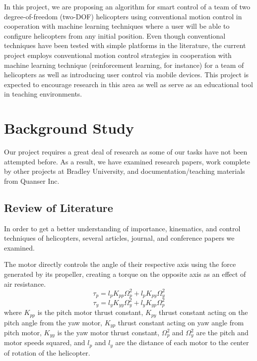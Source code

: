 \documentclass[letterpaper, 10pt, conference]{ieeeconf}
\begin{document}
In this project, we are proposing an algorithm for smart control of a team of two degree-of-freedom (two-DOF) helicopters using conventional motion control in cooperation with machine learning techniques where a user will be able to configure helicopters from any initial position.  Even though conventional techniques have been tested with simple platforms in the literature, the current project employs conventional motion control strategies in cooperation with machine learning technique (reinforcement learning, for instance) for a team of helicopters as well as introducing user control via mobile devices.  This project is expected to encourage research in this area as well as serve as an educational tool in teaching environments.  


\section{Background Study} %
Our project requires a great deal of research as some of our tasks have not been attempted before.  As a result, we have examined research papers, work complete by other projects at Bradley University, and documentation/teaching materials from Quanser Inc.

\subsection{Review of Literature}
In order to get a better understanding of importance, kinematics, and control techniques of helicopters, several articles, journal, and conference papers we examined.



The motor directly controls the angle of their respective axis using the force generated by its propeller, creating a torque on the opposite axis as an effect of air resistance. \cite{Neto}
\begin{equation}
    \tau_p = l_pK_{pp}\Omega^2_p+l_pK_{py}\Omega^2_y
\end{equation}
\begin{equation}
    \tau_y = l_yK_{yy}\Omega^2_y+l_yK_{yp}\Omega^2_p
\end{equation}
where $K_{pp}$ is the pitch motor thrust constant, $K_{py}$ thrust constant acting on the pitch angle from the yaw motor, $K_{yp}$ thrust constant acting on yaw angle from pitch motor, $K_{yy}$ is the yaw motor thrust constant, $\Omega^2_p$ and $\Omega^2_y$ are the pitch and motor speeds squared, and $l_p$ and $l_y$ are the distance of each motor to the center of rotation of the helicopter.
\end{document}
